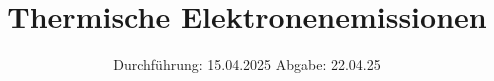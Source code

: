 

\subject{v504}
\title{Thermische Elektronenemissionen}
\date{%
  Durchführung: 15.04.2025
  \hspace{3em}
  Abgabe: 22.04.25
}



\maketitle
\thispagestyle{empty}
\tableofcontents
\newpage






\printbibliography{}


